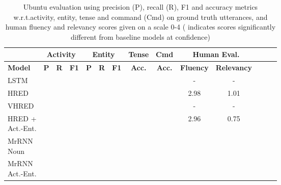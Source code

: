 \documentclass{article}
\begin{document}
\begin{table}[t]
  \caption{Ubuntu evaluation using precision (P), recall (R), F1 and accuracy metrics w.r.t.\@ activity, entity, tense and command (Cmd) on ground truth utterances, and human fluency and relevancy scores given on a scale 0-4 {\small ( indicates scores significantly different from baseline models at  confidence)}} \label{tabel:ubuntu_results}
  \small
  \centering
    \begin{tabular}{lccccccccccccc}
    \toprule
     & \multicolumn{3}{c}{\textbf{Activity}} & \multicolumn{3}{c}{\textbf{Entity}} & \textbf{Tense} & \textbf{Cmd} & \multicolumn{2}{c}{\textbf{Human Eval.\@}} \\ \midrule
    \textbf{Model} & \textbf{P\@} & \textbf{R\@} & \textbf{F1} & \textbf{P\@} & \textbf{R\@} & \textbf{F1} & \textbf{Acc.\@} & \textbf{Acc.\@} & \textbf{Fluency} & \textbf{Relevancy}\\
    \midrule
        \parbox[c][2.65em][c]{0.085\textwidth}{LSTM} &  &  &  &  &  &  &  &  & - & - \\
        \parbox[c][2.65em][c]{0.085\textwidth}{HRED} &  &  &  &  &  &  &  &  & 2.98 & 1.01\\
        \parbox[c][2.65em][c]{0.085\textwidth}{VHRED} &  &  &  &  &  &  &  &  & - & - \\       
        \parbox[c][2.65em][c]{0.085\textwidth}{HRED + \\ Act.\@-Ent.\@} &  &  &  &  &  &  &  &  & 2.96 & 0.75 \\
\parbox[c][2.65em][c]{0.085\textwidth}{MrRNN \\ Noun} &  &  &  &  &  &  &  &  &  &  \\
        \parbox[c][2.65em][c]{0.085\textwidth}{MrRNN \\ Act.\@-Ent.\@} &  &  &  &  &  &  &  &  &  &  \\ \bottomrule
    \end{tabular}
\end{table}
\end{document}
